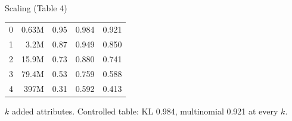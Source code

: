 \documentclass{article}
\newcommand{\Body}{\fontsize{34}{44}\selectfont}
\newlength{\colgap}\setlength{\colgap}{10mm}
\newlength{\colw}\setlength{\colw}{267.5mm}   %
\newlength{\bodyh}\setlength{\bodyh}{1050mm}
\newlength{\rowgap}\setlength{\rowgap}{9mm}
\newlength{\rowA}\setlength{\rowA}{352mm}
\newlength{\rowB}\setlength{\rowB}{362mm}
\newlength{\rowC}\setlength{\rowC}{318mm}      %
\begin{document}
\begin{minipage}[t][\bodyh][t]{\dimexpr 2\colw+\colgap\relax}
\begin{minipage}[t]{\colw}
\begin{pbox}[height=\rowC, valign=center, left=4mm, right=4mm]{Scaling (Table 4)}
{\begin{tabular}{rrc|cc}
0 & 0.63M & 0.95 & 0.984 & 0.921 \\
1 & 3.2M  & 0.87 & 0.949 & 0.850 \\
2 & 15.9M & 0.73 & 0.880 & 0.741 \\
3 & 79.4M & 0.53 & 0.759 & 0.588 \\
4 & 397M  & 0.31 & 0.592 & 0.413 \\
\bottomrule
\end{tabular}}\par
\vspace{8mm}
{\Body\color{dtugrey} $k$ added attributes. Controlled table: KL 0.984, multinomial 0.921 at every $k$.\par}
\end{pbox}
\end{minipage}
\end{minipage}
\end{document}
